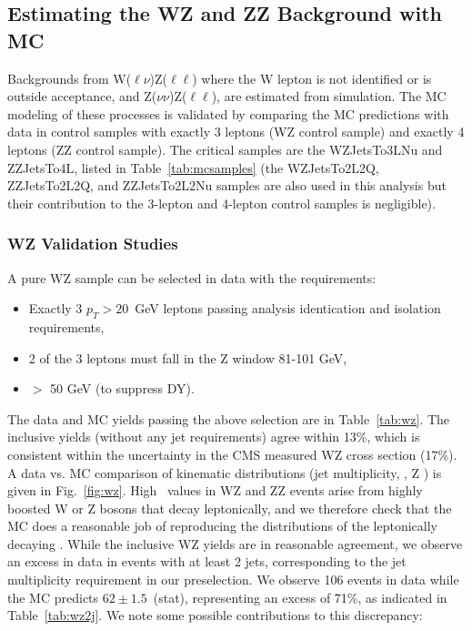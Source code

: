 \clearpage

\subsection{Estimating the WZ and ZZ Background with MC}
\label{sec:bkg_vz}

Backgrounds from W($\ell\nu$)Z($\ell\ell$) where the W lepton is not identified or is outside acceptance, and Z($\nu\nu$)Z($\ell\ell$),
are estimated from simulation. The MC modeling of these processes is validated by comparing the MC predictions with data in control samples
with exactly 3 leptons (WZ control sample) and exactly 4 leptons (ZZ control sample). 
The critical samples are the WZJetsTo3LNu and ZZJetsTo4L, listed in Table~\ref{tab:mcsamples}
(the WZJetsTo2L2Q, ZZJetsTo2L2Q, and ZZJetsTo2L2Nu samples are also used in this analysis but their contribution to the 3-lepton and 4-lepton
control samples is negligible).

\subsubsection{WZ Validation Studies}
\label{sec:bkg_wz}

A pure WZ sample can be selected in data with the requirements:

\begin{itemize}
\item Exactly 3 $p_T>20$~GeV leptons passing analysis identication and isolation requirements,
\item 2 of the 3 leptons must fall in the Z window 81-101 GeV,
\item \MET $>$ 50 GeV (to suppress DY).
\end{itemize}

The data and MC yields passing the above selection are in Table~\ref{tab:wz}. 
The inclusive yields (without any jet requirements) agree within 13\%, which is consistent within
the uncertainty in the CMS measured WZ cross section (17\%). A data vs. MC comparison of kinematic
distributions (jet multiplicity, \MET, Z \pt) is given in Fig.~\ref{fig:wz}. High \MET\ 
values in WZ and ZZ events arise from highly boosted W or Z bosons that decay leptonically, 
and we therefore check that the MC does a reasonable job of reproducing the \pt distributions of the 
leptonically decaying \Z. While the inclusive WZ yields are in reasonable agreement, we observe
an excess in data in events with at least 2 jets, corresponding to the jet multiplicity requirement
in our preselection. We observe 106 events in data while the MC predicts $62\pm1.5$~(stat), representing an excess of 71\%,
as indicated in Table~\ref{tab:wz2j}. We note some possible contributions to this discrepancy:

